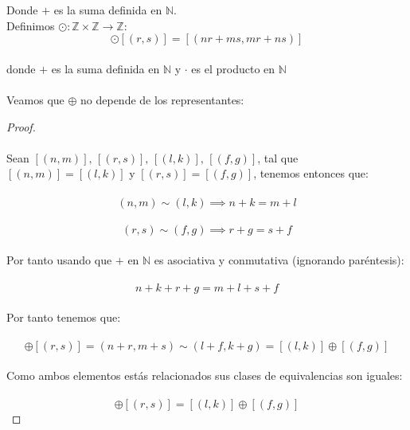\documentclass[11pt,letterpaper]{article}
\newcommand{\N}{\mathbb{N}}
\newcommand{\Z}{\mathbb{Z}}
\begin{document}
    Donde $+$ es la suma definida en $\N$.\,\\
    Definimos $\odot:\Z\times \Z \rightarrow \Z$:\,\\
    \begin{equation*}
        [(n,m)]\odot [(r,s)]=[(nr+ms,mr+ns)]
    \end{equation*}\,\\
    donde $+$ es la suma definida en $\N$ y $\cdot$ es el producto en $\N$\,\\
    \,\\
    Veamos que $\oplus$ no depende de los representantes:\,\\
    \begin{proof}\,\\
    \,\\
    Sean $[(n,m)],\,[(r,s)],\,[(l,k)],\,[(f,g)]$, tal que $[(n,m)]=[(l,k)]$ y $[(r,s)]=[(f,g)]$, tenemos entonces que:\,\\
    \,\\
    \begin{equation*}
        (n,m)\sim(l,k)\implies n+k=m+l 
    \end{equation*}\,\\
    \begin{equation*}
        (r,s)\sim(f,g)\implies r+g=s+f
    \end{equation*}\,\\
    Por tanto usando que $+$ en $\N$ es asociativa y conmutativa (ignorando par\'entesis):\,\\
    \,\\
    \begin{equation*}
        n+k+r+g=m+l+s+f
    \end{equation*}\,\\
    Por tanto tenemos que:\,\\
    \,\\
    \begin{equation*}
        [(n,m)]\oplus[(r,s)]=(n+r,m+s)\sim(l+f,k+g)=[(l,k)]\oplus[(f,g)]
    \end{equation*}\,\\
    Como ambos elementos est\'as relacionados sus clases de equivalencias son iguales:\,\\
    \,\\
    \begin{equation*}
        [(n,m)]\oplus[(r,s)]=[(l,k)]\oplus[(f,g)]
    \end{equation*}
    \end{proof}
    \,\\
\end{document}
